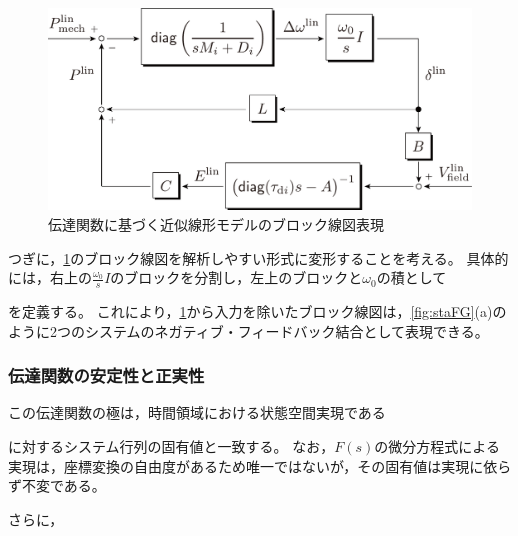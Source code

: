\documentclass[tombow,dvipdfmx]{corona-a5}
\begin{document}
\begin{figure}[t]
\centering
\includegraphics[width = .75\linewidth]{figs/blocklinsys2}
\caption{伝達関数に基づく近似線形モデルのブロック線図表現}
\label{fig:blocklin}
\end{figure}




つぎに，\ref{fig:blocklin}のブロック線図を解析しやすい形式に変形することを考える。
具体的には，右上の$\frac{\omega_0}{s}I$のブロックを分割し，左上のブロックと$\omega_0$の積として



を定義する。
これにより，\ref{fig:blocklin}から入力を除いたブロック線図は，\ref{fig:staFG}(a)のように2つのシステムのネガティブ・フィードバック結合として表現できる。

\subsubsection{伝達関数の安定性と正実性}



この伝達関数の極は，時間領域における状態空間実現である



に対するシステム行列の固有値と一致する。
なお，$F(s)$の微分方程式による実現は，座標変換の自由度があるため唯一ではないが，その固有値は実現に依らず不変である。

さらに，
\end{document}
